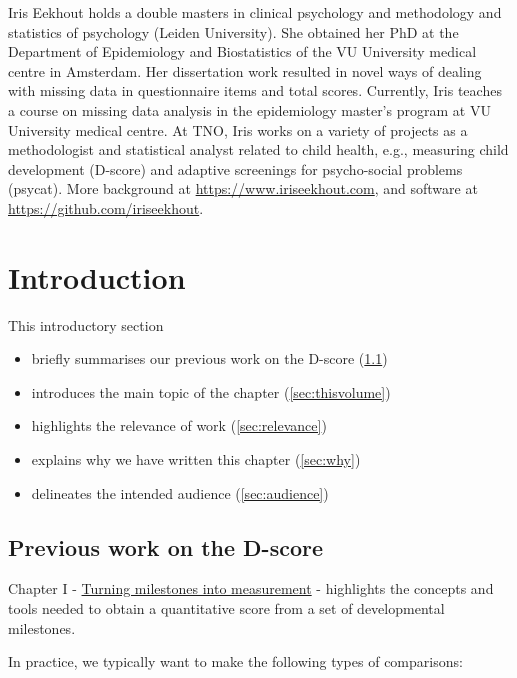 \documentclass[
]{book}
\providecommand{\tightlist}{%
  \setlength{\itemsep}{0pt}\setlength{\parskip}{0pt}}
\begin{document}
Iris Eekhout holds a double masters in clinical psychology and methodology and statistics of psychology (Leiden University). She obtained her PhD at the Department of Epidemiology and Biostatistics of the VU University medical centre in Amsterdam. Her dissertation work resulted in novel ways of dealing with missing data in questionnaire items and total scores. Currently, Iris teaches a course on missing data analysis in the epidemiology master's program at VU University medical centre. At TNO, Iris works on a variety of projects as a methodologist and statistical analyst related to child health, e.g., measuring child development (D-score) and adaptive screenings for psycho-social problems (psycat). More background at \url{https://www.iriseekhout.com}, and software at \url{https://github.com/iriseekhout}.

\newpage

\hypertarget{ch:introduction2}{%
\chapter{Introduction}\label{ch:introduction2}}

This introductory section

\begin{itemize}
\tightlist
\item
  briefly summarises our previous work on the D-score (\ref{sec:previous})
\item
  introduces the main topic of the chapter (\ref{sec:thisvolume})
\item
  highlights the relevance of work (\ref{sec:relevance})
\item
  explains why we have written this chapter (\ref{sec:why})
\item
  delineates the intended audience (\ref{sec:audience})
\end{itemize}

\hypertarget{sec:previous}{%
\section{Previous work on the D-score}\label{sec:previous}}

Chapter I - \href{https://d-score.org/dbook1}{Turning milestones into measurement} - highlights the concepts and tools needed to obtain a quantitative score from a set of developmental milestones.

In practice, we typically want to make the following types of comparisons:
\end{document}
